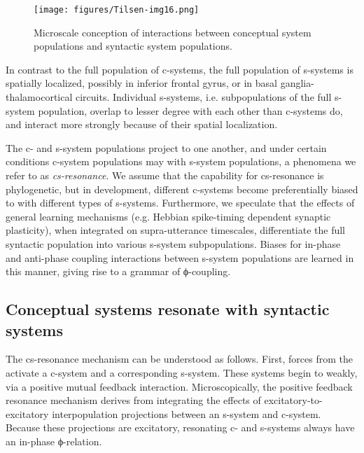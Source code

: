   
\begin{figure}
\texttt{[image: figures/Tilsen-img16.png]}
\caption{Microscale conception of interactions between conceptual system populations and syntactic system populations.}
\label{fig:2:9}
\end{figure}
 

  In contrast to the full population of c-systems, the full population of s-systems is spatially localized, possibly in inferior frontal gyrus, or in basal ganglia-thalamocortical circuits. Individual s-systems, i.e. subpopulations of the full s-system population, overlap to lesser degree with each other than c-systems do, and interact more strongly because of their spatial localization. 

  The c- and s-system populations project to one another, and under certain conditions c-system populations may  with s-system populations, a phenomena we refer to as \textit{cs-resonance}. We assume that the capability for cs-resonance is phylogenetic, but in development, different c-systems become preferentially biased to  with different types of s-systems. Furthermore, we speculate that the effects of general learning mechanisms (e.g. Hebbian spike-timing dependent synaptic plasticity), when integrated on supra-utterance timescales, differentiate the full syntactic population into various s-system subpopulations. Biases for in-phase and anti-phase coupling interactions between s-system populations are learned in this manner, giving rise to a grammar of ϕ-coupling.

\subsection{Conceptual systems resonate with syntactic systems}

The cs-resonance mechanism can be understood as follows. First, forces from the  activate a c-system and a corresponding s-system. These systems begin to  weakly, via a positive mutual feedback interaction. Microscopically, the positive feedback resonance mechanism derives from integrating the effects of excitatory-to-excitatory interpopulation projections between an s-system and c-system. Because these projections are excitatory, resonating c- and s-systems always have an in-phase ϕ-relation. 

